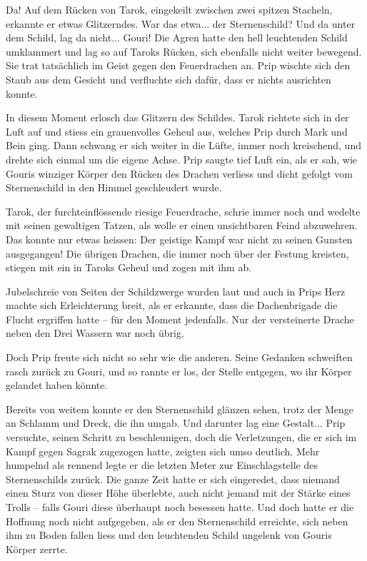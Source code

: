 Da! Auf dem Rücken von Tarok, eingekeilt zwischen zwei spitzen Stacheln, erkannte er etwas Glitzerndes. War das etwa... der Sternenschild? Und da unter dem Schild, lag da nicht... Gouri! Die Agren hatte den hell leuchtenden Schild umklammert und lag so auf Taroks Rücken, sich ebenfalls nicht weiter bewegend. Sie trat tatsächlich im Geist gegen den Feuerdrachen an. Prip wischte sich den Staub aus dem Gesicht und verfluchte sich dafür, dass er nichts ausrichten konnte.

In diesem Moment erlosch das Glitzern des Schildes. Tarok richtete sich in der Luft auf und stiess ein grauenvolles Geheul aus, welches Prip durch Mark und Bein ging. Dann schwang er sich weiter in die Lüfte, immer noch kreischend, und drehte sich einmal um die eigene Achse. Prip saugte tief Luft ein, als er sah, wie Gouris winziger Körper den Rücken des Drachen verliess und dicht gefolgt vom Sternenschild in den Himmel geschleudert wurde.

Tarok, der furchteinflössende riesige Feuerdrache, schrie immer noch und wedelte mit seinen gewaltigen Tatzen, als wolle er einen unsichtbaren Feind abzuwehren. Das konnte nur etwas heissen: Der geistige Kampf war nicht zu seinen Gunsten ausgegangen! Die übrigen Drachen, die immer noch über der Festung kreisten, stiegen mit ein in Taroks Geheul und zogen mit ihm ab.

Jubelschreie von Seiten der Schildzwerge wurden laut und auch in Prips Herz machte sich Erleichterung breit, als er erkannte, dass die Dachenbrigade die Flucht ergriffen hatte – für den Moment jedenfalls. Nur der versteinerte Drache neben den Drei Wassern war noch übrig.

Doch Prip freute sich nicht so sehr wie die anderen. Seine Gedanken schweiften rasch zurück zu Gouri, und so rannte er los, der Stelle entgegen, wo ihr Körper gelandet haben könnte.

Bereits von weitem konnte er den Sternenschild glänzen sehen, trotz der Menge an Schlamm und Dreck, die ihn umgab. Und darunter lag eine Gestalt... Prip versuchte, seinen Schritt zu beschleunigen, doch die Verletzungen, die er sich im Kampf gegen Sagrak zugezogen hatte, zeigten sich umso deutlich. Mehr humpelnd als rennend legte er die letzten Meter zur Einschlagstelle des Sternenschilds zurück. Die ganze Zeit hatte er sich eingeredet, dass niemand einen Sturz von dieser Höhe überlebte, auch nicht jemand mit der Stärke eines Trolls – falls Gouri diese überhaupt noch besessen hatte. Und doch hatte er die Hoffnung noch nicht aufgegeben, als er den Sternenschild erreichte, sich neben ihm zu Boden fallen liess und den leuchtenden Schild ungelenk von Gouris Körper zerrte.

